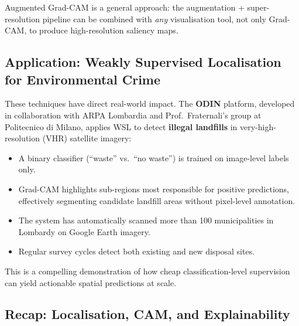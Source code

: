 \documentclass[11pt,a4paper]{article}
\newcommand{\term}[1]{\textcolor{DefGreen}{\textbf{#1}}\index{#1}}
\begin{document}
\begin{insightbox}
Augmented Grad-CAM is a general approach: the augmentation + super-resolution pipeline can be combined with \emph{any} visualisation tool, not only Grad-CAM, to produce high-resolution saliency maps.
\end{insightbox}

\subsection{Application: Weakly Supervised Localisation for Environmental Crime}

These techniques have direct real-world impact. The \term{ODIN} platform, developed in collaboration with ARPA Lombardia and Prof.\ Fraternali's group at Politecnico di Milano, applies WSL to detect \textbf{illegal landfills} in very-high-resolution (VHR) satellite imagery:

\begin{itemize}
  \item A binary classifier (``waste'' vs.\ ``no waste'') is trained on image-level labels only.
  \item Grad-CAM highlights sub-regions most responsible for positive predictions, effectively segmenting candidate landfill areas without pixel-level annotation.
  \item The system has automatically scanned more than 100 municipalities in Lombardy on Google Earth imagery.
  \item Regular survey cycles detect both existing and new disposal sites.
\end{itemize}

This is a compelling demonstration of how cheap classification-level supervision can yield actionable spatial predictions at scale.

\subsection{Recap: Localisation, CAM, and Explainability}
\end{document}

